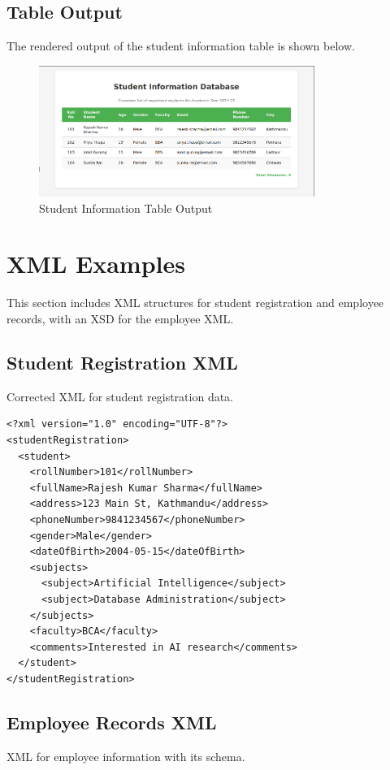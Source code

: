\documentclass[a4paper,12pt]{article}
\begin{document}
\subsection{Table Output}
The rendered output of the student information table is shown below.

\begin{figure}[h]
    \centering
    \includegraphics[width=0.8\textwidth]{9_screenshot.png}
    \caption{Student Information Table Output}
\end{figure}


\section{XML Examples}
This section includes XML structures for student registration and employee records, with an XSD for the employee XML.

\subsection{Student Registration XML}
Corrected XML for student registration data.

\lstset{language=XML}
\begin{lstlisting}
<?xml version="1.0" encoding="UTF-8"?>
<studentRegistration>
  <student>
    <rollNumber>101</rollNumber>
    <fullName>Rajesh Kumar Sharma</fullName>
    <address>123 Main St, Kathmandu</address>
    <phoneNumber>9841234567</phoneNumber>
    <gender>Male</gender>
    <dateOfBirth>2004-05-15</dateOfBirth>
    <subjects>
      <subject>Artificial Intelligence</subject>
      <subject>Database Administration</subject>
    </subjects>
    <faculty>BCA</faculty>
    <comments>Interested in AI research</comments>
  </student>
</studentRegistration>
\end{lstlisting}

\subsection{Employee Records XML}
XML for employee information with its schema.
\end{document}
